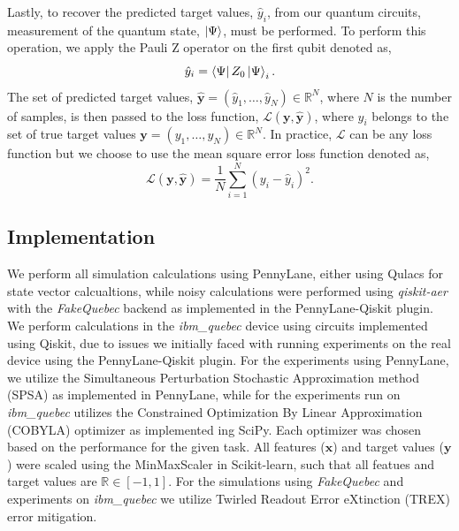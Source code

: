 \documentclass[journal=jacsat,manuscript=article]{achemso}
\begin{document}
Lastly, to recover the predicted target values, $\hat{y}_{i}$, from our quantum circuits, measurement of the quantum state, $\ket{\Psi}$, must be performed.
To perform this operation, we apply the Pauli Z operator on the first qubit denoted as,
\begin{equation}
	\hat{y}_{i} = \bra{\Psi}Z_{0}\ket{\Psi}_{i}.
	\label{eq:y_pred}
\end{equation}
The set of predicted target values, $\bm{\hat{y}} = (\hat{y}_{1}, \ldots, \hat{y}_{N}) \in \mathbb{R}^{N}$, where $N$ is the number of samples, is then passed to the loss function, $\mathcal{L}(\bm{y}, \bm{\hat y})$, where $y_{i}$ belongs to the set of true target values $\bm{y} = (y_{1}, \ldots, y_{N}) \in \mathbb{R}^{N}$.
In practice, $\mathcal{L}$ can be any loss function but we choose to use the mean square error loss function denoted as,
\begin{equation}
	\mathcal{L}(\bm{y}, \bm{\hat y}) = \frac{1}{N} \sum_{i=1}^{N} (y_{i} - \hat{y}_{i})^{2}.
	\label{eq:isthisloss}
\end{equation}


\subsection{Implementation}
We perform all simulation calculations using PennyLane\cite{bergholm_pennylane_2022}, either using Qulacs\cite{suzuki_qulacs_2021} for state vector calcualtions, while noisy calculations were performed using \textit{qiskit-aer} with the \textit{FakeQuebec} backend as implemented in the PennyLane-Qiskit plugin.\cite{javadi-abhari_quantum_2024}
We perform calculations in the \textit{ibm\_quebec} device using circuits implemented using Qiskit\cite{javadi-abhari_quantum_2024}, due to issues we initially faced with running experiments on the real device using the PennyLane-Qiskit plugin.
For the experiments using PennyLane,  we utilize the Simultaneous Perturbation Stochastic Approximation method (SPSA) as implemented in PennyLane, while for the experiments run on \textit{ibm\_quebec} utilizes the Constrained Optimization By Linear Approximation (COBYLA) optimizer as implemented ing SciPy\cite{virtanen_scipy_2020}.
Each optimizer was chosen based on the performance for the given task.
All features ($\mathbf{x}$) and target values ($\mathbf{y}$) were scaled using the MinMaxScaler in Scikit-learn\cite{pedregosa_scikit-learn_2011}, such that all featues and target values are $\mathbb{R}\in [ -1,1 ]$.
For the simulations using \textit{FakeQuebec} and experiments on \textit{ibm\_quebec} we utilize Twirled Readout Error eXtinction (TREX) error mitigation.
\end{document}
